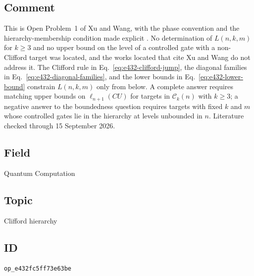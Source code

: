 \subsection*{Comment}

This is Open Problem~1 of Xu and Wang, with the phase convention and the
hierarchy-membership condition made explicit .
No determination of $L(n,k,m)$ for $k\geq3$ and no upper bound on the level of
a controlled gate with a non-Clifford target was located, and the works
located that cite Xu and Wang do not address it.  The Clifford rule in
Eq.~\eqref{eq:e432-clifford-jump}, the diagonal families in
Eq.~\eqref{eq:e432-diagonal-families}, and the lower bounds in
Eq.~\eqref{eq:e432-lower-bound} constrain $L(n,k,m)$ only from below.  A
complete answer requires matching upper bounds on $\ell_{n+1}(CU)$ for targets
in $\mathcal C_k(n)$ with $k\geq3$; a negative answer to the boundedness
question requires targets with fixed $k$ and $m$ whose controlled gates lie in
the hierarchy at levels unbounded in $n$.  Literature checked through 15 September 2026.

\subsection*{Field}

Quantum Computation

\subsection*{Topic}

Clifford hierarchy

\subsection*{ID}

\texttt{op\_e432fc5ff73e63be}
